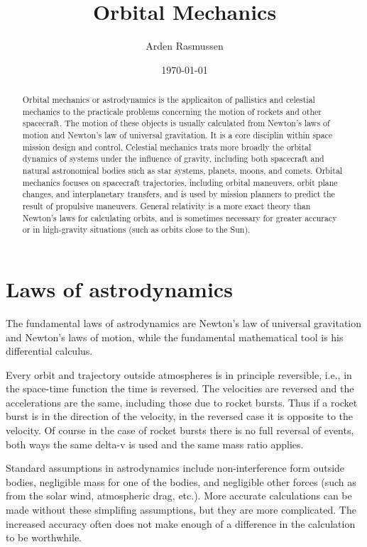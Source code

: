 \documentclass{article}
\title{Orbital Mechanics}
\date{\today}
\author{Arden Rasmussen}
\begin{document}
\maketitle
\newpage
\begin{abstract}
  Orbital mechanics or astrodynamics is the applicaiton of pallistics and celestial mechanics to the practicale problems concerning the motion of rockets and other spacecraft. The motion of these objects is usually calculated from Newton's laws of motion and Newton's law of universal gravitation. It is a core disciplin within space mission design and control. Celestial mechanics trats more broadly the orbital dynamics of systems under the influence of gravity, including both spacecraft and natural astronomical bodies such as star systems, planets, moons, and comets. Orbital mechanics focuses on spacecraft trajectories, including orbital maneuvers, orbit plane changes, and interplanetary transfers, and is used by mission planners to predict the result of propulsive maneuvers. General relativity is a more exact theory than Newton's laws for calculating orbits, and is sometimes necessary for greater accuracy or in high-gravity situations (such as orbits close to the Sun).
\end{abstract}
\newpage
\tableofcontents
\newpage
\section{Laws of astrodynamics}
The fundamental laws of astrodynamics are Newton's law of universal gravitation and Newton's laws of motion, while the fundamental mathematical tool is his differential calculus.

Every orbit and trajectory outside atmospheres is in principle reversible, i.e., in the space-time function the time is reversed. The velocities are reversed and the accelerations are the same, including those due to rocket bursts. Thus if a rocket burst is in the direction of the velocity, in the reversed case it is opposite to the velocity. Of course in the case of rocket bursts there is no full reversal of events, both ways the same delta-v is used and the same mass ratio applies.

Standard assumptions in astrodynamics include non-interference form outside bodies, negligible mass for one of the bodies, and negligible other forces (such as from the solar wind, atmospheric drag, etc.). More accurate calculations can be made without these simplifing assumptions, but they are more complicated. The increased accuracy often does not make enough of a difference in the calculation to be worthwhile.
\end{document}

